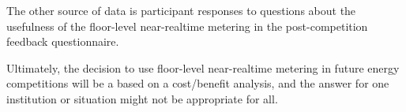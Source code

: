 The other source of data is participant responses to questions about the usefulness of the floor-level near-realtime metering in the post-competition feedback questionnaire.

Ultimately, the decision to use floor-level near-realtime metering in future energy competitions will be a based on a cost/benefit analysis, and the answer for one institution or situation might not be appropriate for all.